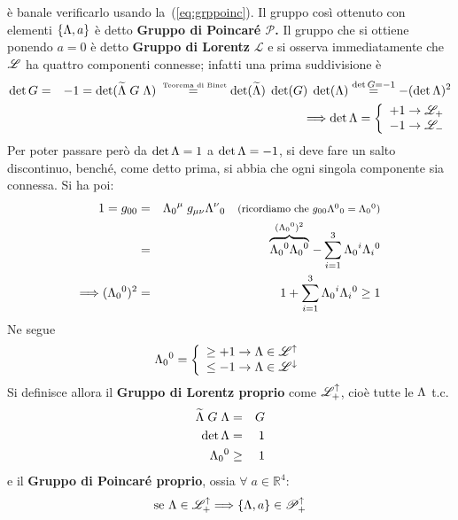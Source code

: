 \`e banale verificarlo usando la~(\ref{eq:grppoinc}). Il gruppo cos\`i
ottenuto con elementi  $\{\Lambda,a\}$ \`e detto
\textbf{Gruppo di Poincar\'e $\mathscr{P}$.}  
\newline 
Il gruppo che si  ottiene ponendo
$a=0$ \`e detto \textbf{Gruppo di Lorentz} $\mathscr{L}$ e 
si osserva immediatamente che $\mathscr{L}$ ha quattro componenti
connesse; infatti una prima suddivisione \`e
\begin{eqnarray*}
\det G &=& -1 = \det (\widetilde{\Lambda}\;G\;\Lambda) 
\stackrel{\tiny\mbox{ Teorema  di Binet}}{=}
\det(\widetilde{\Lambda})\;\det(G)\;\det(\Lambda) \stackrel{\tiny \det
G=-1}{=}-(\det \Lambda)^2\\ &&
\Longrightarrow
\det\Lambda=\left\{
	 \begin{array}{ll} 
	  +1 \rightarrow \mathscr{L}_{+}\\
	 -1 \rightarrow \mathscr{L}_{-}
	 \end{array}
	\right.
\end{eqnarray*}
Per poter passare per\`o da $\det \Lambda=1$ a $\det\Lambda=-1$, si deve
fare un salto discontinuo, bench\'e, come detto prima, si abbia
che ogni singola componente sia connessa. Si ha poi:
\begin{eqnarray*}
1 = g_{00} & = & \la_{0}{}^{\mu} \; g_{\mu\nu}\la^{\nu}{}_{0} \quad 
\mbox{\footnotesize(ricordiamo che
$g_{00}\la^{0}{}_{0}=\la_{0}{}^{0}$)}\\
%
 & = & \stackrel{(\la_{0}{}^{0})^2}{\overbrace{\la_{0}{}^{0}\la_{0}{}^{0}}}
- \sum_{i=1}^{3}\la_{0}{}^{i}\la_{i}{}^{0}\\
\Longrightarrow (\la_{0}{}^{0})^2  & = &  1 +
\sum_{i=1}^{3}\la_{0}{}^{i}\la_{i}{}^{0}\geq1
\end{eqnarray*}
Ne segue
\begin{equation}
\Lambda_{0}{}^{0} = \left\{
		 \begin{array}{ll} 
		  \geq +1 \rightarrow \Lambda \in \mathscr{L}^{\uparrow}\\
		  \leq -1 \rightarrow \Lambda \in \mathscr{L}^{\downarrow}
		 \end{array}
		\right.
\end{equation}
Si definisce allora il \textbf{Gruppo di Lorentz proprio}
come $\mathscr{L}^{\uparrow}_{+}$, cio\`e
tutte le $\Lambda$ t.c.
\begin{eqnarray*}
\widetilde{\Lambda}\;G\;\Lambda&=&G\\
\det \Lambda&=&1\\
\Lambda_{0}{}^{0}&\geq&1
\end{eqnarray*}
e il \textbf{Gruppo di Poincar\'e proprio}, ossia $\forall\;a \in \mathbb{R}^4$: 
\begin{equation}
 \mbox{se }\Lambda\in\mathscr{L}^{\uparrow}_{+}
 \Longrightarrow \{\Lambda,a\}\in\mathscr{P}^{\uparrow}_{+}
\end{equation}
